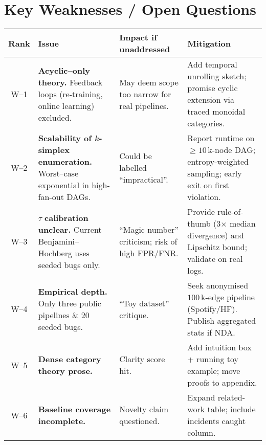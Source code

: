 \documentclass{article}
\begin{document}
\section{Key Weaknesses / Open Questions}
\begin{longtable}{@{}c L{4.8cm} L{3.2cm} L{4.0cm}@{}}
\toprule
\textbf{Rank} & \textbf{Issue} & \textbf{Impact if unaddressed} & \textbf{Mitigation} \\
\midrule
\endhead
W--1 & \textbf{Acyclic--only theory.} Feedback loops (re\hyp training, online learning) excluded. & May deem scope too narrow for real pipelines. & Add temporal unrolling sketch; promise cyclic extension via traced monoidal categories. \\
W--2 & \textbf{Scalability of \(k\)-simplex enumeration.} Worst--case exponential in high\hyp fan\hyp out DAGs. & Could be labelled ``impractical''. & Report runtime on \(\ge 10\,\mathrm{k}\)-node DAG; entropy\hyp weighted sampling; early exit on first violation. \\
W--3 & \(\tau\) \textbf{calibration unclear.} Current Benjamini--Hochberg uses seeded bugs only. & ``Magic number'' criticism; risk of high FPR/FNR. & Provide rule\hyp of\hyp thumb (3\(\times\) median divergence) and Lipschitz bound; validate on real logs. \\
W--4 & \textbf{Empirical depth.} Only three public pipelines \& 20 seeded bugs. & ``Toy dataset'' critique. & Seek anonymised \(100\,\mathrm{k}\)-edge pipeline (Spotify/HF). Publish aggregated stats if NDA. \\
W--5 & \textbf{Dense category theory prose.} & Clarity score hit. & Add intuition box + running toy example; move proofs to appendix. \\
W--6 & \textbf{Baseline coverage incomplete.} & Novelty claim questioned. & Expand related\hyp work table; include incidents caught column. \\
\bottomrule
\end{longtable}
\end{document}

